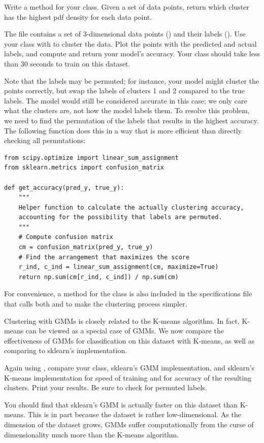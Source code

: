 \begin{problem}
Write a  method for your class.
Given a set of data points, return which cluster has the highest pdf density for each data point.

The file  contains a set of 3-dimensional data points () and their labels ().
Use your class with  to cluster the data.
Plot the points with the predicted and actual labels, and compute and return your model's accuracy.
Your class should take less than 30 seconds to train on this dataset.

Note that the labels may be permuted; for instance, your model might cluster the points correctly, but swap the labels of clusters 1 and 2 compared to the true labels.
The model would still be considered accurate in this case; we only care what the clusters are, not how the model labels them.
To resolve this problem, we need to find the permutation of the labels that results in the highest accuracy.
The following function does this in a way that is more efficient than directly checking all permutations:
\begin{lstlisting}
from scipy.optimize import linear_sum_assignment
from sklearn.metrics import confusion_matrix

def get_accuracy(pred_y, true_y):
    """
    Helper function to calculate the actually clustering accuracy,
    accounting for the possibility that labels are permuted.
    """
    # Compute confusion matrix
    cm = confusion_matrix(pred_y, true_y)
    # Find the arrangement that maximizes the score
    r_ind, c_ind = linear_sum_assignment(cm, maximize=True)
    return np.sum(cm[r_ind, c_ind]) / np.sum(cm)
\end{lstlisting}

For convenience, a method  for the class is also included in the specifications file that calls both  and  to make the clustering process simpler.
\end{problem}

Clustering with GMMs is closely related to the K-means algorithm.
In fact, K-means can be viewed as a special case of GMMs.
We now compare the effectiveness of GMMs for classification on this dataset with K-means, as well as comparing to sklearn's implementation.

\begin{problem}
Again using , compare your class, sklearn's GMM implementation, and sklearn's K-means implementation for speed of training and for accuracy of the resulting clusters.
Print your results.
Be sure to check for permuted labels.
\end{problem}
You should find that sklearn's GMM is actually faster on this dataset than K-means.
This is in part because the dataset is rather low-dimensional.
As the dimension of the dataset grows, GMMs suffer computationally from the curse of dimensionality much more than the K-means algorithm.


